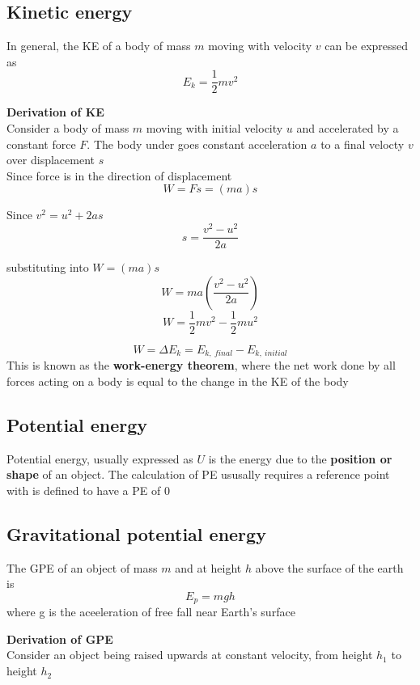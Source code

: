\documentclass[a4paper, 10pt]{article}
\begin{document}
\subsection{Kinetic energy}

In general, the KE of a body of mass $m$ moving with velocity $v$ can be expressed as
\[
E_k = \frac{1}{2}mv^2
\]

\textbf{Derivation of KE} \\
Consider a body of mass $m$ moving with initial velocity $u$ and accelerated by a constant force $F$. The body under goes constant acceleration $a$ to a final velocty $v$ over displacement $s$ \\

Since force is in the direction of displacement
\[
   W = Fs = (ma)s
\]

Since $v^2 = u^2 + 2as$ 
\[
   s = \frac{v^2 - u^2}{2a}
\]

substituting into $W = (ma)s$ 
\[
   W = ma \left(\frac{v^2 - u^2}{2a}\right)
\]
\[
W = \frac{1}{2}mv^2 - \frac{1}{2}mu^2
\]
\begin{framed}
\[
   W = \Delta E_k = E_{k,\ final} - E_{k,\ initial}
\]
This is known as the \textbf{work-energy theorem}, where the net work done by all forces acting on a body is equal to the change in the KE of the body
\end{framed}	





\subsection{Potential energy}
Potential energy, usually expressed as $U$ is the energy due to the \textbf{position or shape} of an object. The calculation of PE ususally requires a reference point with is defined to have a PE of $0$ 

\subsection{Gravitational potential energy}
The GPE of an object of mass $m$ and at height $h$ above the surface of the earth is 
\[
E_p = mgh
\]
where g is the aceeleration of free fall near Earth's surface

\textbf{Derivation of GPE} \\
Consider an object being raised upwards at constant velocity, from height $h_1$ to height $h_2$\\
\end{document}
